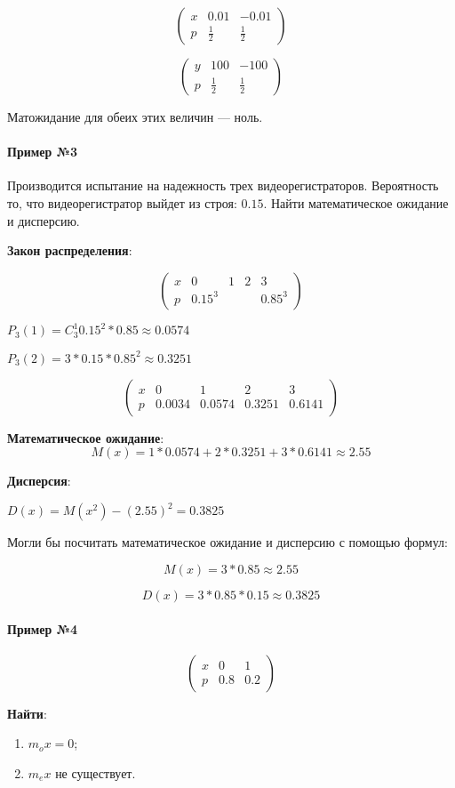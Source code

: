 \documentclass{article}
\begin{document}
$$
\begin{pmatrix}
    x & 0.01 & -0.01 \\
    p & \frac{1}{2} & \frac{1}{2}
\end{pmatrix}
$$


$$
\begin{pmatrix}
    y & 100 & -100 \\
    p & \frac{1}{2} & \frac{1}{2}
\end{pmatrix}
$$

Матожидание для обеих этих величин — ноль.

\paragraph{Пример №3}

Производится испытание на надежность трех видеорегистраторов. Вероятность то, что видеорегистратор выйдет из строя: $0.15$. Найти математическое ожидание и дисперсию.

\textbf{Закон распределения}:

$$
\begin{pmatrix}
    x & 0 & 1 & 2 & 3 \\
    p & 0.15^3 & & & 0.85^3
\end{pmatrix}
$$

$P_3(1) = C_{3}^{1} 0.15^2 * 0.85 \approx 0.0574$

$P_3(2) = 3 * 0.15 * 0.85^2 \approx 0.3251$

$$
\begin{pmatrix}
    x & 0 & 1 & 2 & 3 \\
    p & 0.0034 & 0.0574 & 0.3251 & 0.6141
\end{pmatrix}
$$

\textbf{Математическое ожидание}: $$M(x) = 1 * 0.0574 + 2 * 0.3251 + 3 * 0.6141 \approx 2.55$$

\textbf{Дисперсия}:

$D(x) = M(x^2) - (2.55)^2 = 0.3825$

Могли бы посчитать математическое ожидание и дисперсию с помощью формул:

$$
M(x) = 3 * 0.85 \approx 2.55
$$

$$
D(x) = 3 * 0.85 * 0.15 \approx 0.3825
$$

\paragraph{Пример №4}

$$
\begin{pmatrix}
    x & 0 & 1 \\
    p & 0.8 & 0.2
\end{pmatrix}
$$

\textbf{Найти}:

\begin{enumerate}
    \item $m_{o} x = 0$;
    \item $m_{e} x$ не существует.
\end{enumerate}
\end{document}
